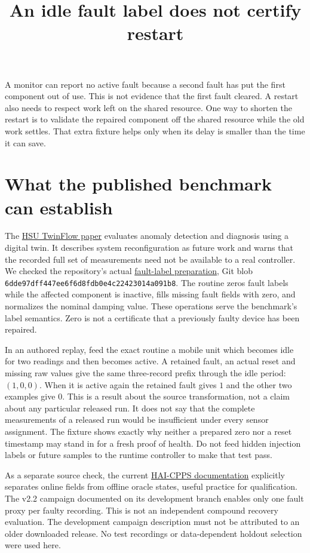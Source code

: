 \documentclass[11pt]{article}
\title{An idle fault label does not certify restart}
\date{}
\begin{document}
\maketitle

A monitor can report no active fault because a second fault has
put the first component out of use. This is not evidence that
the first fault cleared. A restart also needs to respect work
left on the shared resource. One way to shorten the restart is
to validate the repaired component off the shared resource while
the old work settles. That extra fixture helps only when its
delay is smaller than the time it can save.

\section{What the published benchmark can establish}
The \href{https://drops.dagstuhl.de/entities/document/10.4230/OASIcs.DX.2026.7}
{HSU TwinFlow paper} evaluates anomaly detection and diagnosis using
a digital twin. It describes system reconfiguration as future work
and warns that the recorded full set of measurements need not be
available to a real controller. We checked the repository's actual
\href{https://github.com/imb-hsu/twinflow/blob/d8c623bbf3866b6edef4ef3f3b160229fd5c46f4/scripts/prepare_data.py}
{fault-label preparation}, Git blob
\texttt{6dde97dff447ee6f6d8fdb0e4c22423014a091b8}. The routine zeros
fault labels while the affected component is inactive, fills missing
fault fields with zero, and normalizes the nominal damping value.
These operations serve the benchmark's label semantics. Zero is not
a certificate that a previously faulty device has been repaired.

In an authored replay, feed the exact routine a mobile unit which
becomes idle for two readings and then becomes active. A retained
fault, an actual reset and missing raw values give the same
three-record prefix through the idle period: \((1,0,0)\).
When it is active again the retained fault gives \(1\) and the
other two examples give \(0\). This is a result about the source
transformation, not a claim about any particular released run.
It does not say that the complete measurements of a released
run would be insufficient under every sensor assignment.
The fixture shows exactly why neither a prepared zero nor a
reset timestamp may stand in for a fresh proof of health.
Do not feed hidden injection labels or future samples to the
runtime controller to make that test pass.

As a separate source check, the current
\href{https://j-ehrhardt.github.io/hai-cpps-benchmark/}
{HAI-CPPS documentation} explicitly separates online fields
from offline oracle states, useful practice for qualification.
The v2.2 campaign documented on its development branch enables
only one fault proxy per faulty recording. This is not an
independent compound recovery evaluation. The development
campaign description must not be attributed to an older
downloaded release. No test recordings or data-dependent
holdout selection were used here.
\end{document}

